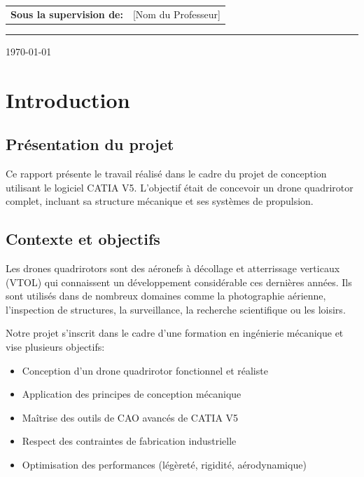 \documentclass[a4paper,12pt]{report}
\begin{document}
\begin{titlepage}
\begin{center}
        \vspace{0.8cm}
        
        \begin{tabular}{l l}
            \textbf{Sous la supervision de:} & [Nom du Professeur] \\
        \end{tabular}
        
        \vspace{1.5cm}
        
        \begin{center}
            \textcolor{bleuPrimaire}{\rule{0.7\textwidth}{1pt}}
        \end{center}
        
        \vspace{0.5cm}
        
        {\Large{\textcolor{gris}{\today}}}
        
    \end{center}
\end{titlepage}

\tableofcontents
\newpage

\chapter{Introduction}

\section{Présentation du projet}
Ce rapport présente le travail réalisé dans le cadre du projet de conception utilisant le logiciel CATIA V5. L'objectif était de concevoir un drone quadrirotor complet, incluant sa structure mécanique et ses systèmes de propulsion.

\section{Contexte et objectifs}
Les drones quadrirotors sont des aéronefs à décollage et atterrissage verticaux (VTOL) qui connaissent un développement considérable ces dernières années. Ils sont utilisés dans de nombreux domaines comme la photographie aérienne, l'inspection de structures, la surveillance, la recherche scientifique ou les loisirs.

Notre projet s'inscrit dans le cadre d'une formation en ingénierie mécanique et vise plusieurs objectifs:
\begin{itemize}
    \item Conception d'un drone quadrirotor fonctionnel et réaliste
    \item Application des principes de conception mécanique
    \item Maîtrise des outils de CAO avancés de CATIA V5
    \item Respect des contraintes de fabrication industrielle
    \item Optimisation des performances (légèreté, rigidité, aérodynamique)
\end{itemize}
\end{document}
